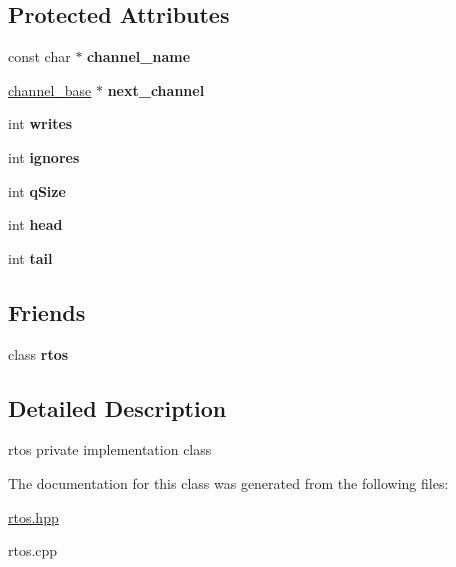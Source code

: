 \subsection*{Protected Attributes}
\begin{DoxyCompactItemize}
\item 
const char $\ast$ {\bfseries channel\+\_\+name}\hypertarget{classrtos_1_1channel__base_a3bf6e1331394d5ab745a3a7ed379350c}{}\label{classrtos_1_1channel__base_a3bf6e1331394d5ab745a3a7ed379350c}

\item 
\hyperlink{classrtos_1_1channel__base}{channel\+\_\+base} $\ast$ {\bfseries next\+\_\+channel}\hypertarget{classrtos_1_1channel__base_a5fa1e6fec7ef127baa8d5e4582c96eb6}{}\label{classrtos_1_1channel__base_a5fa1e6fec7ef127baa8d5e4582c96eb6}

\item 
int {\bfseries writes}\hypertarget{classrtos_1_1channel__base_acf4e395fcddb620239e68aacc53711d7}{}\label{classrtos_1_1channel__base_acf4e395fcddb620239e68aacc53711d7}

\item 
int {\bfseries ignores}\hypertarget{classrtos_1_1channel__base_a0dd92b2936e1e9b33990a59705e8b24f}{}\label{classrtos_1_1channel__base_a0dd92b2936e1e9b33990a59705e8b24f}

\item 
int {\bfseries q\+Size}\hypertarget{classrtos_1_1channel__base_ac7974548c1d1d39b09604640810d22cd}{}\label{classrtos_1_1channel__base_ac7974548c1d1d39b09604640810d22cd}

\item 
int {\bfseries head}\hypertarget{classrtos_1_1channel__base_a9a1e9fd7c97df262cdce5c2fc084148d}{}\label{classrtos_1_1channel__base_a9a1e9fd7c97df262cdce5c2fc084148d}

\item 
int {\bfseries tail}\hypertarget{classrtos_1_1channel__base_a220c246220377d32026f5d26c352b3dd}{}\label{classrtos_1_1channel__base_a220c246220377d32026f5d26c352b3dd}

\end{DoxyCompactItemize}
\subsection*{Friends}
\begin{DoxyCompactItemize}
\item 
class {\bfseries rtos}\hypertarget{classrtos_1_1channel__base_a2a7bcfc34141352757ad672e3ecd099f}{}\label{classrtos_1_1channel__base_a2a7bcfc34141352757ad672e3ecd099f}

\end{DoxyCompactItemize}


\subsection{Detailed Description}
rtos private implementation class 

The documentation for this class was generated from the following files\+:\begin{DoxyCompactItemize}
\item 
\hyperlink{rtos_8hpp}{rtos.\+hpp}\item 
rtos.\+cpp\end{DoxyCompactItemize}
